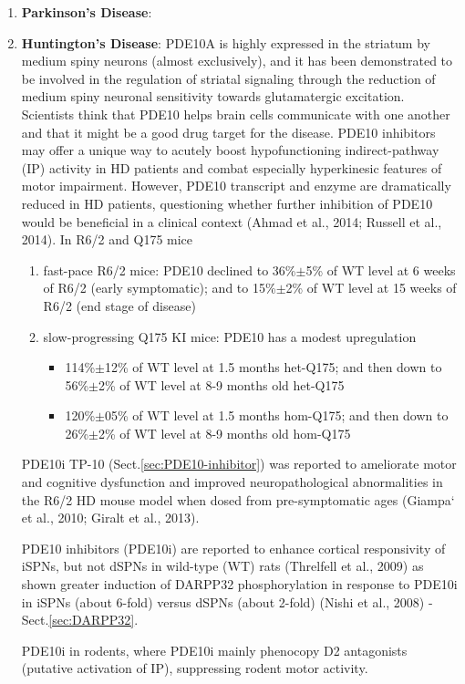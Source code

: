 \begin{enumerate}
  
  \item {\bf Parkinson's Disease}:
  
  \item {\bf Huntington's Disease}:
PDE10A is highly expressed in the striatum by medium spiny neurons (almost
exclusively), and it has been demonstrated to be involved in the regulation of
striatal signaling through the reduction of medium spiny neuronal sensitivity
towards glutamatergic excitation. Scientists think that PDE10 helps brain cells
communicate with one another and that it might be a good drug target for the
disease. PDE10 inhibitors may offer a unique way to acutely boost
hypofunctioning indirect-pathway (IP) activity in HD patients and combat
especially hyperkinesic features of motor impairment.
However, PDE10 transcript and enzyme are dramatically
reduced in HD patients, questioning whether further inhibition
of PDE10 would be beneficial in a clinical context (Ahmad
et al., 2014; Russell et al., 2014). In R6/2 and Q175 mice

\begin{enumerate}
  \item fast-pace R6/2 mice: PDE10 \Bmax declined to 36\%$\pm$5\% of WT level at
  6 weeks of R6/2 (early symptomatic); and to 15\%$\pm$2\% of WT level at 15 weeks of R6/2 (end
  stage of disease)
  
  \item slow-progressing Q175 KI mice: PDE10 \Bmax has a modest upregulation
  \begin{itemize} 

    \item 114\%$\pm$12\% of WT level at 1.5 months het-Q175; and then down to
    56\%$\pm$2\% of WT level at 8-9 months old het-Q175

    \item 120\%$\pm$05\% of WT level at 1.5 months hom-Q175; and then down to
    26\%$\pm$2\% of WT level at 8-9 months old hom-Q175
  \end{itemize}

\end{enumerate}

PDE10i TP-10 (Sect.\ref{sec:PDE10-inhibitor}) was reported to ameliorate motor
and cognitive dysfunction and improved neuropathological abnormalities in the
R6/2 HD mouse model when dosed from pre-symptomatic ages (Giampa` et al., 2010;
Giralt et al., 2013).

PDE10 inhibitors (PDE10i) are reported to enhance cortical responsivity of
iSPNs, but not dSPNs in wild-type (WT) rats (Threlfell et al., 2009) as shown
greater induction of DARPP32 phosphorylation in response to PDE10i
in iSPNs (about 6-fold) versus dSPNs (about 2-fold) (Nishi et al., 2008) -
Sect.\ref{sec:DARPP32}.

PDE10i in rodents, where PDE10i mainly phenocopy D2 antagonists (putative
activation of IP), suppressing rodent motor activity.

\end{enumerate}




